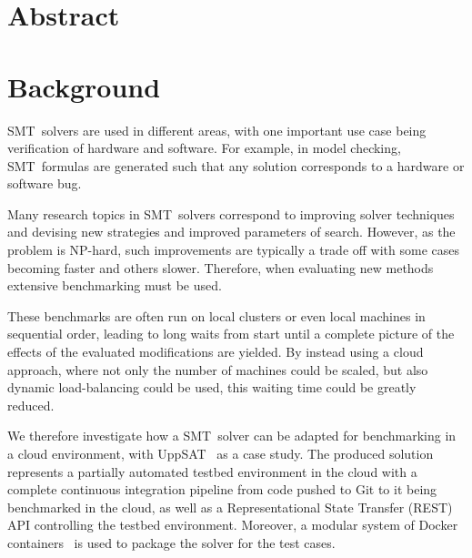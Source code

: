 \documentclass{article}
\begin{document}


\begin{multicols}{2}

\section*{Abstract}

\textbf{ \textit {  }}

\section*{Background}

SMT~solvers are used in different areas, with one important use case being
verification of hardware and software. For example, in model checking,
SMT~formulas are generated such that any solution corresponds to a hardware or
software bug.

Many research topics in SMT~solvers correspond to improving solver techniques
and devising new strategies and improved parameters of search. However, as the
problem is NP-hard, such improvements are typically a trade off with some cases
becoming faster and others slower. Therefore, when evaluating new methods
extensive benchmarking must be used.

These benchmarks are often run on local clusters or even local machines in
sequential order, leading to long waits from start until a complete picture of
the effects of the evaluated modifications are yielded. By instead using a cloud
approach, where not only the number of machines could be scaled, but also
dynamic load-balancing could be used, this waiting time could be greatly
reduced.

We therefore investigate how a SMT~solver can be adapted for benchmarking in a
cloud environment, with UppSAT~\cite{uppsat} as a case study. The produced
solution represents a partially automated testbed environment in the cloud with
a complete continuous integration pipeline from code pushed to Git to it being
benchmarked in the cloud, as well as a Representational State Transfer (REST)
API controlling the testbed environment. Moreover, a modular system of Docker
containers~\cite{docker} is used to package the solver for the test cases.


\end{multicols}
\end{document}
